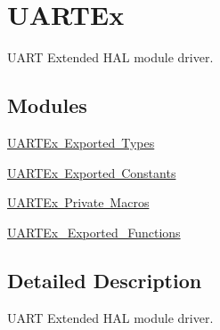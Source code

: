\hypertarget{group___u_a_r_t_ex}{}\section{U\+A\+R\+T\+Ex}
\label{group___u_a_r_t_ex}


U\+A\+RT Extended H\+AL module driver.  


\subsection*{Modules}
\begin{DoxyCompactItemize}
\item 
\mbox{\hyperlink{group___u_a_r_t_ex___exported___types}{U\+A\+R\+T\+Ex Exported Types}}
\item 
\mbox{\hyperlink{group___u_a_r_t_ex___exported___constants}{U\+A\+R\+T\+Ex Exported Constants}}
\item 
\mbox{\hyperlink{group___u_a_r_t_ex___private___macros}{U\+A\+R\+T\+Ex Private Macros}}
\item 
\mbox{\hyperlink{group___u_a_r_t_ex___exported___functions}{U\+A\+R\+T\+Ex\+\_\+\+Exported\+\_\+\+Functions}}
\end{DoxyCompactItemize}


\subsection{Detailed Description}
U\+A\+RT Extended H\+AL module driver. 

